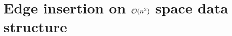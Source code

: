 





\section{Edge insertion on \texorpdfstring{${\cal O}(n^2)$}{quadratic} space data structure} \label{appendix: edge-insertion-n^2-space-ds}

